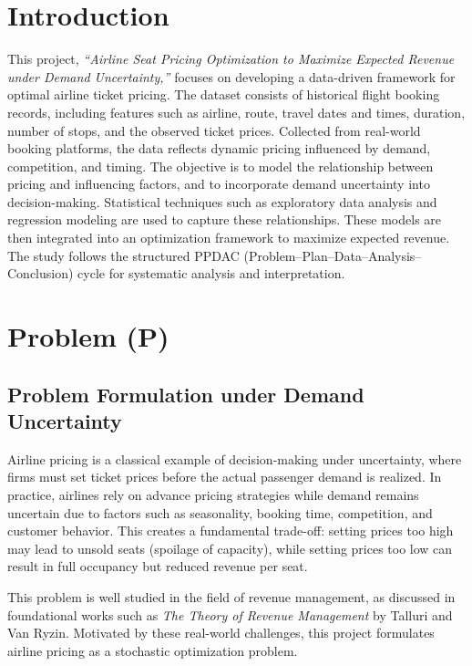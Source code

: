 \documentclass[12pt]{article}
\begin{document}
\section{Introduction}

This project, \textit{“Airline Seat Pricing Optimization to Maximize Expected Revenue under Demand Uncertainty,”} focuses on developing a data-driven framework for optimal airline ticket pricing. The dataset consists of historical flight booking records, including features such as airline, route, travel dates and times, duration, number of stops, and the observed ticket prices. Collected from real-world booking platforms, the data reflects dynamic pricing influenced by demand, competition, and timing. The objective is to model the relationship between pricing and influencing factors, and to incorporate demand uncertainty into decision-making. Statistical techniques such as exploratory data analysis and regression modeling are used to capture these relationships. These models are then integrated into an optimization framework to maximize expected revenue. The study follows the structured PPDAC (Problem–Plan–Data–Analysis–Conclusion) cycle for systematic analysis and interpretation.

\section{Problem (P)}
\subsection{Problem Formulation under Demand Uncertainty}

Airline pricing is a classical example of decision-making under uncertainty, where firms must set ticket prices before the actual passenger demand is realized. In practice, airlines rely on advance pricing strategies while demand remains uncertain due to factors such as seasonality, booking time, competition, and customer behavior. This creates a fundamental trade-off: setting prices too high may lead to unsold seats (spoilage of capacity), while setting prices too low can result in full occupancy but reduced revenue per seat.

This problem is well studied in the field of revenue management, as discussed in foundational works such as \textit{The Theory of Revenue Management} by Talluri and Van Ryzin. Motivated by these real-world challenges, this project formulates airline pricing as a stochastic optimization problem.
\end{document}
